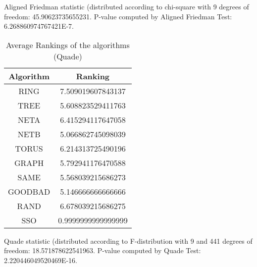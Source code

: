 \documentclass[a4paper,10pt]{article}
\begin{document}
\begin{landscape}
Aligned Friedman statistic (distributed according to chi-square with 9 degrees of freedom: 45.90623735655231. 
P-value computed by Aligned Friedman Test: 6.268860974767421E-7.\newline


\newpage

\begin{table}[!htp]
\centering
\caption{Average Rankings of the algorithms (Quade)
}\begin{tabular}{c|c}
Algorithm&Ranking\\
\hline
 RING&7.509019607843137\\
 TREE&5.608823529411763\\
 NETA&6.415294117647058\\
 NETB&5.066862745098039\\
 TORUS&6.214313725490196\\
 GRAPH&5.792941176470588\\
 SAME&5.568039215686273\\
 GOODBAD&5.146666666666666\\
 RAND&6.678039215686275\\
 SSO&0.9999999999999999\\
\end{tabular}
\end{table}
Quade statistic (distributed according to F-distribution with 9 and 441 degrees of freedom: 18.571878622541963. 
P-value computed by Quade Test: 2.220446049520469E-16.\newline


\newpage


\end{landscape}
\end{document}
